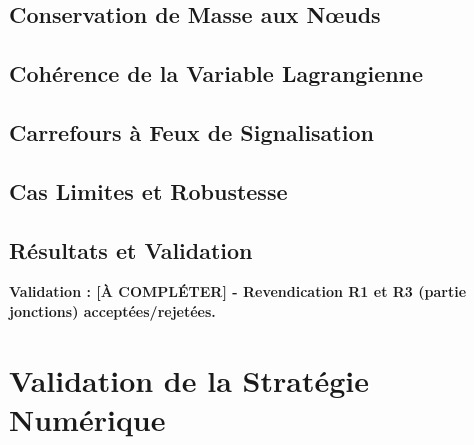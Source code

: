 \subsection{Conservation de Masse aux Nœuds}
\label{subsec:conservation_masse_noeuds}

\subsection{Cohérence de la Variable Lagrangienne}
\label{subsec:coherence_variable_w}

\subsection{Carrefours à Feux de Signalisation}
\label{subsec:carrefours_feux}

\subsection{Cas Limites et Robustesse}
\label{subsec:cas_limites_jonctions}

\subsection{Résultats et Validation}
\label{subsec:resultats_jonctions}

\textbf{Validation : [À COMPLÉTER] - Revendication R1 et R3 (partie jonctions) acceptées/rejetées.}

\section{Validation de la Stratégie Numérique}
\label{sec:validation_numerique}

